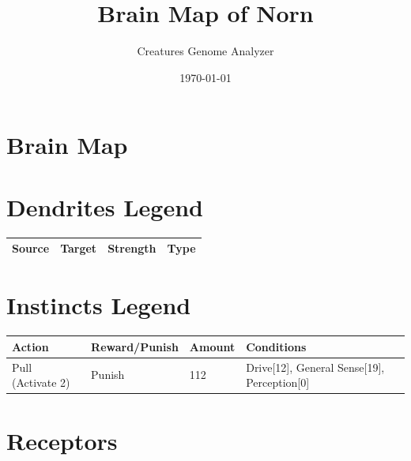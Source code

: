 \documentclass{article}
\title{Brain Map of Norn}
\author{Creatures Genome Analyzer}
\date{\today}
\begin{document}
\maketitle

\section*{Brain Map}

\begin{center}
\begin{tikzpicture}[scale=0.5]
\end{tikzpicture}
\end{center}

\section*{Dendrites Legend}

\begin{longtable}{|p{3cm}|p{3cm}|p{3cm}|p{3cm}|}
\hline
{\bf Source} & {\bf Target} & {\bf Strength} & {\bf Type} \\ \hline
\end{longtable}

\section*{Instincts Legend}

\begin{longtable}{|p{3cm}|p{3cm}|p{3cm}|p{3cm}|}
\hline
{\bf Action} & {\bf Reward/Punish} & {\bf Amount} & {\bf Conditions} \\ \hline
Pull (Activate 2) & Punish & 112 & Drive[12], General Sense[19], Perception[0] \\ \hline
\end{longtable}

\section*{Receptors}
\end{document}
